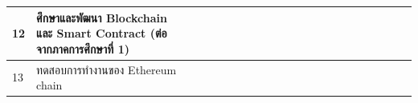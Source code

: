 \documentclass[12pt,oneside,openright,a4paper]{cpe-thai-project}
\begin{document}
\begin{table}[h]
{\begin{tabular}{|llllllllllllllllllllll|}
\multicolumn{1}{|l|}{12}                    & \multicolumn{1}{l|}{ศึกษาและพัฒนา Blockchain และ Smart Contract (ต่อจากภาคการศึกษาที่ 1)} & \multicolumn{1}{l|}{\cellcolor[HTML]{2D8C9F}} & \multicolumn{1}{l|}{\cellcolor[HTML]{2D8C9F}} & \multicolumn{1}{l|}{\cellcolor[HTML]{2D8C9F}} & \multicolumn{1}{l|}{\cellcolor[HTML]{2D8C9F}} & \multicolumn{1}{l|}{\cellcolor[HTML]{2D8C9F}} & \multicolumn{1}{l|}{\cellcolor[HTML]{2D8C9F}} & \multicolumn{1}{l|}{\cellcolor[HTML]{2D8C9F}} & \multicolumn{1}{l|}{\cellcolor[HTML]{2D8C9F}} & \multicolumn{1}{l|}{\cellcolor[HTML]{2D8C9F}} & \multicolumn{1}{l|}{\cellcolor[HTML]{2D8C9F}} & \multicolumn{1}{l|}{\cellcolor[HTML]{2D8C9F}} & \multicolumn{1}{l|}{\cellcolor[HTML]{2D8C9F}} & \multicolumn{1}{l|}{\cellcolor[HTML]{2D8C9F}} & \multicolumn{1}{l|}{\cellcolor[HTML]{2D8C9F}} & \multicolumn{1}{l|}{\cellcolor[HTML]{2D8C9F}} & \multicolumn{1}{l|}{\cellcolor[HTML]{2D8C9F}} & \multicolumn{1}{l|}{\cellcolor[HTML]{2D8C9F}{\color[HTML]{2D8C9F} }} & \multicolumn{1}{l|}{\cellcolor[HTML]{2D8C9F}{\color[HTML]{2D8C9F} }} & \multicolumn{1}{l|}{\cellcolor[HTML]{2D8C9F}{\color[HTML]{2D8C9F} }} & \cellcolor[HTML]{2D8C9F}{\color[HTML]{2D8C9F} } \\ \hline
\multicolumn{1}{|l|}{13}                    & \multicolumn{1}{l|}{ทดสอบการทำงานของ Ethereum chain}                                      & \multicolumn{1}{l|}{\cellcolor[HTML]{2D8C9F}} & \multicolumn{1}{l|}{\cellcolor[HTML]{2D8C9F}} & \multicolumn{1}{l|}{\cellcolor[HTML]{2D8C9F}} & \multicolumn{1}{l|}{\cellcolor[HTML]{2D8C9F}} & \multicolumn{1}{l|}{\cellcolor[HTML]{2D8C9F}} & \multicolumn{1}{l|}{\cellcolor[HTML]{2D8C9F}} & \multicolumn{1}{l|}{\cellcolor[HTML]{2D8C9F}} & \multicolumn{1}{l|}{\cellcolor[HTML]{2D8C9F}} & \multicolumn{1}{l|}{\cellcolor[HTML]{2D8C9F}} & \multicolumn{1}{l|}{\cellcolor[HTML]{2D8C9F}} & \multicolumn{1}{l|}{\cellcolor[HTML]{2D8C9F}} & \multicolumn{1}{l|}{\cellcolor[HTML]{2D8C9F}} & \multicolumn{1}{l|}{\cellcolor[HTML]{2D8C9F}} & \multicolumn{1}{l|}{\cellcolor[HTML]{2D8C9F}} & \multicolumn{1}{l|}{\cellcolor[HTML]{2D8C9F}} & \multicolumn{1}{l|}{\cellcolor[HTML]{2D8C9F}} & \multicolumn{1}{l|}{\cellcolor[HTML]{2D8C9F}{\color[HTML]{2D8C9F} }} & \multicolumn{1}{l|}{\cellcolor[HTML]{2D8C9F}{\color[HTML]{2D8C9F} }} & \multicolumn{1}{l|}{\cellcolor[HTML]{2D8C9F}{\color[HTML]{2D8C9F} }} & \cellcolor[HTML]{2D8C9F}{\color[HTML]{2D8C9F} } \\ \hline

\end{tabular}}
\end{table}
\end{document}
